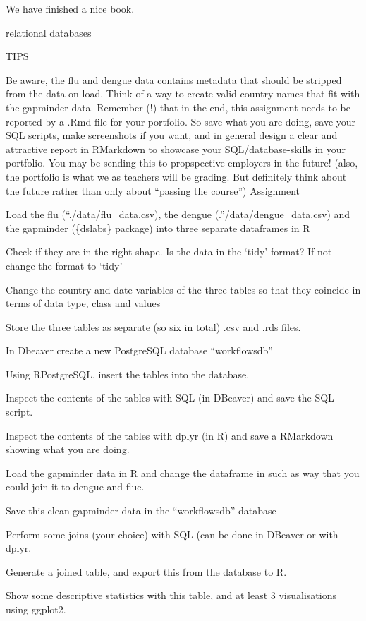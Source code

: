 \documentclass[
]{book}
\begin{document}
We have finished a nice book.

relational databases

TIPS

Be aware, the flu and dengue data contains metadata that should be stripped from the data on load.
Think of a way to create valid country names that fit with the gapminder data.
Remember (!) that in the end, this assignment needs to be reported by a .Rmd file for your portfolio. So save what you are doing, save your SQL scripts, make screenshots if you want, and in general design a clear and attractive report in RMarkdown to showcase your SQL/database-skills in your portfolio. You may be sending this to propspective employers in the future! (also, the portfolio is what we as teachers will be grading. But definitely think about the future rather than only about ``passing the course'')
Assignment

Load the flu (``./data/flu\_data.csv), the dengue (.''/data/dengue\_data.csv) and the gapminder (\{dslabs\} package) into three separate dataframes in R

Check if they are in the right shape. Is the data in the `tidy' format? If not change the format to `tidy'

Change the country and date variables of the three tables so that they coincide in terms of data type, class and values

Store the three tables as separate (so six in total) .csv and .rds files.

In Dbeaver create a new PostgreSQL database ``workflowsdb''

Using RPostgreSQL, insert the tables into the database.

Inspect the contents of the tables with SQL (in DBeaver) and save the SQL script.

Inspect the contents of the tables with dplyr (in R) and save a RMarkdown showing what you are doing.

Load the gapminder data in R and change the dataframe in such as way that you could join it to dengue and flue.

Save this clean gapminder data in the ``workflowsdb'' database

Perform some joins (your choice) with SQL (can be done in DBeaver or with dplyr.

Generate a joined table, and export this from the database to R.

Show some descriptive statistics with this table, and at least 3 visualisations using ggplot2.
\end{document}
